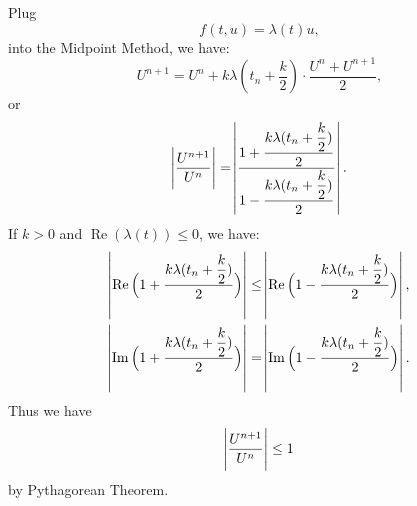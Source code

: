 \documentclass[11pt]{article}
\begin{document}
\pagebreak
\section{}

\pagebreak
\section{}

\pagebreak
\section{}
\subsection{}

\subsection{}

\subsection{}
Plug
\begin{equation}
    f(t, u) = \lambda(t)u,
\nonumber\end{equation}
into the Midpoint Method, we have:
\begin{equation}
    U^{n+1} = U^n + k\lambda(t_n + \dfrac k2)\cdot\dfrac{U^n+U^{n+1}}2,
\nonumber\end{equation}
or
\begin{equation}
    \abs{\dfrac{U^{n+1}}{U^n}} =
    \abs{\dfrac{1+\dfrac{k\lambda(t_n+\dfrac k2)}2}{1-\dfrac{k\lambda(t_n+\dfrac k2)}2}}.
\end{equation}
If $k>0$ and $\operatorname{Re}(\lambda(t)) \leq 0$, we have:
\begin{equation}\begin{split}
    \abs{\operatorname{Re}\Big(1+\dfrac{k\lambda(t_n+\dfrac k2)}2\Big)}
    &\leq\abs{\operatorname{Re}\Big(1-\dfrac{k\lambda(t_n+\dfrac k2)}2\Big)},\\
    \abs{\operatorname{Im}\Big(1+\dfrac{k\lambda(t_n+\dfrac k2)}2\Big)}
    &=\abs{\operatorname{Im}\Big(1-\dfrac{k\lambda(t_n+\dfrac k2)}2\Big)}.
\end{split}\end{equation}
Thus we have
\begin{equation}
    \abs{\dfrac{U^{n+1}}{U^n}} \leq 1
\end{equation}
by Pythagorean Theorem.
\end{document}
